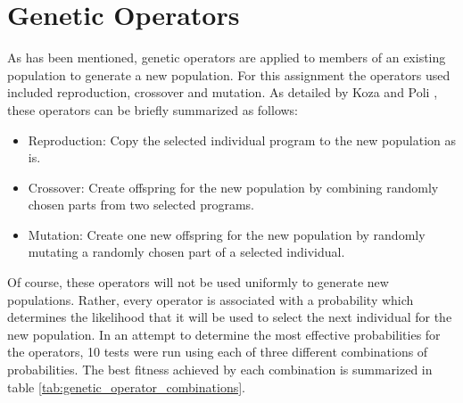 \section{Genetic Operators}\label{sec:genetic_operators}
As has been mentioned, genetic operators are applied to members of an existing population to generate a new population. For this assignment the operators used included reproduction, crossover and mutation. As detailed by Koza and Poli \cite{koza2005genetic}, these operators can be briefly summarized as follows:

\begin{itemize}
    \item Reproduction: Copy the selected individual program to the new population as is.
    \item Crossover: Create offspring for the new population by combining randomly chosen parts from two selected programs.
    \item Mutation: Create one new offspring for the new population by randomly mutating a randomly chosen part of a selected individual.
\end{itemize}

Of course, these operators will not be used uniformly to generate new populations. Rather, every operator is associated with a probability which determines the likelihood that it will be used to select the next individual for the new population. In an attempt to determine the most effective probabilities for the operators, 10 tests were run using each of three different combinations of probabilities. The best fitness achieved by each combination is summarized in table \ref{tab:genetic_operator_combinations}.

\begin{table}[H]
\caption{Genetic Operator Combinations}
\label{tab:genetic_operator_combinations}
\end{table}

